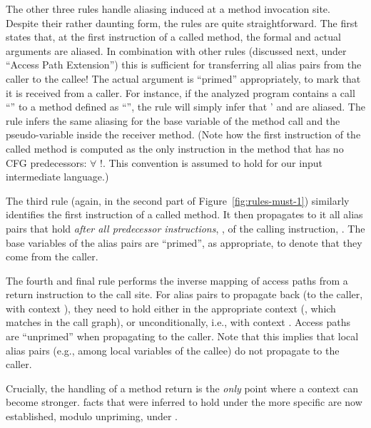The other three rules handle aliasing induced at a method invocation
site.  Despite their rather daunting form, the rules are quite
straightforward. The first states that, at the first instruction of a
called method, the formal and actual arguments are aliased. In
combination with other rules (discussed next, under ``Access Path
Extension'') this is sufficient for transferring all alias pairs from
the caller to the callee!  The actual argument is ``primed''
appropriately, to mark that it is received from a caller. For
instance, if the analyzed program contains a call ``'' to a
method defined as ``'', the rule will simply
infer that ' and  are aliased.  The rule infers the same
aliasing for the base variable of the method call and the
pseudo-variable  inside the receiver method. (Note how the
first instruction of the called method is computed as the only
instruction in the method that has no CFG predecessors:
$\forall$ \rightrulearrow{} !.  This
convention is assumed to hold for our input intermediate language.)

The third rule (again, in the second part of Figure~\ref{fig:rules-must-1})
similarly identifies the first instruction of a called method. It then
propagates to it all alias pairs that hold \emph{after all predecessor
instructions}, , of the calling instruction, . The base
variables of the alias pairs are ``primed'', as appropriate, to denote that
they come from the caller.

The fourth and final rule performs the inverse mapping of access paths from a
return instruction to the call site. For alias pairs to propagate back (to the
caller, with context ), they need to hold either in the appropriate
context (, which matches  in the call graph), or
unconditionally, i.e., with context . Access paths are
``unprimed'' when propagating to the caller. Note that this implies that local
alias pairs (e.g., among local variables of the callee) do not propagate to the
caller.

Crucially, the handling of a method return is the \emph{only} point where a context can
become stronger.  facts that were inferred to hold under
the more specific  are now established, modulo unpriming, under
.

